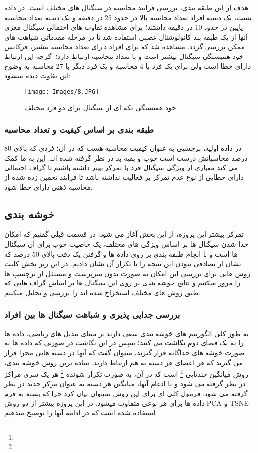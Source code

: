 \documentclass[11pt]{extarticle}
\begin{document}
هدف از این طبقه بندی، بررسی فرایند محاسبه در سیگنال های مختلف است. در داده تست، یک دسته افراد تعداد محاسبه بالا در حدود 25 در دقیقه و یک دسته تعداد محاسبه پایین در حدود 10 در دقیقه داشتند؛ برای مشاهده تفاوت های احتمالی سیگنال مغزی آنها از یک طبقه بند کانولوشنال عصبی استفاده شد تا در مرحله مقدماتی شباهت های ممکن بررسی گردد. مشاهده شد که برای افراد دارای تعداد محاسبه بیشتر، فرکانس خود همبستگی سیگنال بیشتر است و با تعداد محاسبه ارتباط دارد؛ اگرچه این ارتباط دارای خطا است ولی برای یک فرد با 4 محاسبه و یک فرد دیگر با 27 محاسبه به وضوح این تفاوت دیده میشود:

\begin{figure}[h!]
	\centering
	\texttt{[image: Images/8.JPG]}
	\caption{خود همبستگی تکه ای از سیگنال برای دو فرد مختلف}
	\label{fig:17}
\end{figure}

\subsubsection{طبقه بندی بر اساس کیفیت و تعداد محاسبه}

در داده اولیه، برچسپی به عنوان کیفیت محاسبه هست که در آن؛ فردی که بالای 80 درصد محاسباتش درست است خوب و بقیه بد در نظر گرفته شده اند. این به ما کمک می کند معیاری از ویژگی سیگنال فرد با تمرکز بهتر داشته باشیم تا گراف احتمالی دارای خطایی از نوع عدم تمرکز بر فعالیت نداشته باشد تا فرایند تخمین زده شده از محاسبه ذهنی دارای خطا شود. 

\subsection{خوشه بندی}

تمرکز بیشتر این پروژه، از این بخش آغاز می شود. در قسمت قبلی گفتیم که امکان جدا شدن سیگنال ها بر اساس ویژگی های مختلف، یک خاصیت خوب برای آن سیگنال ها است و با انجام طبقه بندی بر روی داده ها و گرفتن یک دقت بالای 50 درصد که نشان از تصادفی نبودن این نتیجه را با تکرار آن نشان دادیم. در این زیر بخش کلیت روش هایی برای بررسی این امکان به صورت بدون سرپرست و مستقل از برچسپ ها را مرور میکنیم و نتایج خوشه بندی بر روی این سیگنال ها بر اساس گراف هایی که طبق روش های مختلف استخراج شده اند را بررسی و تحلیل میکنیم. 

\subsubsection{بررسی جدایی پذیری و شباهت سیگنال ها بین افراد}

به طور کلی الگوریتم های خوشه بندی سعی دارند بر مبنای تبدیل های ریاضی، داده ها را به یک فضای دوم نگاشت می کنند؛ سپس در این نگاشت در صورتی که داده ها به صورت خوشه های جداگانه قرار گیرند، میتوان گفت که آنها در دسته هایی مجزا قرار می گیرند که هر اعضای هر دسته به هم ارتباط دارند. ساده ترین روش خوشه بندی، روش میانگین چندتایی
\footnote{}
است که در آن، به صورت تکرار شونده
\footnote{}
هر یک سری مراکز در نظر گرفته می شود و با ادغام آنها، میانگین هر دسته به عنوان مرکز جدید در نظر گرفته می شود. فرمول کلی ای برای این روش نمیتوان بیان کرد چرا که بسته به فرم داده ها برای هر نوعی متفاوت میشود. در این پروژه بیشتر از دو روش PCA و TSNE استفاده شده است که در ادامه آنها را توضیح میدهیم.
\end{document}
